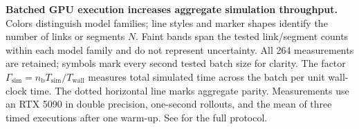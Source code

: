 \caption{\textbf{Batched GPU execution increases aggregate simulation throughput.} Colors distinguish model families; line styles and marker shapes identify the number of links or segments $N$. Faint bands span the tested link/segment counts within each model family and do not represent uncertainty. All 264 measurements are retained; symbols mark every second tested batch size for clarity. The factor $\Gamma_\mathrm{sim}=n_\mathrm{b}T_\mathrm{sim}/T_\mathrm{wall}$ measures total simulated time across the batch per unit wall-clock time. The dotted horizontal line marks aggregate parity. Measurements use an RTX 5090 in double precision, one-second rollouts, and the mean of three timed executions after one warm-up. See  for the full protocol.}
